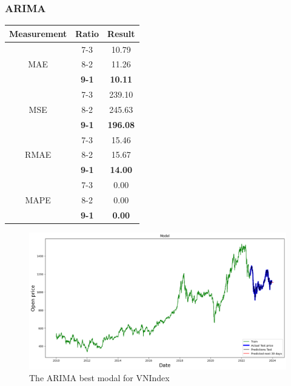 \documentclass{ieeeojies}
\begin{document}
\subsubsection{ARIMA}
\begin{table}[H]
    \centering
    \begin{tabular}{|c|c|c|}
        \hline
         Measurement & Ratio &  Result  \\
        \hline
             & 7-3 & 10.79  \\
        MAE  & 8-2 & 11.26  \\
            & \textbf{9-1} & \textbf{10.11}  \\
        \hline
           & 7-3 & 239.10  \\
        MSE  & 8-2 & 245.63  \\
            & \textbf{9-1} & \textbf{196.08}  \\
        \hline
           & 7-3 & 15.46  \\
        RMAE  & 8-2 & 15.67  \\
            & \textbf{9-1} & \textbf{14.00}  \\
        \hline
           & 7-3 & 0.00  \\
        MAPE  & 8-2 & 0.00  \\
            & \textbf{9-1} & \textbf{0.00}  \\
        \hline
    \end{tabular}
    \label{table:example}
\end{table}
\begin{figure}[H]
    \centering
    \includegraphics[width=0.8\linewidth]{ARIMA-VNI-.png}
    \caption{The ARIMA best modal for VNIndex}
    \label{fig:example}
\end{figure}

\end{document}
